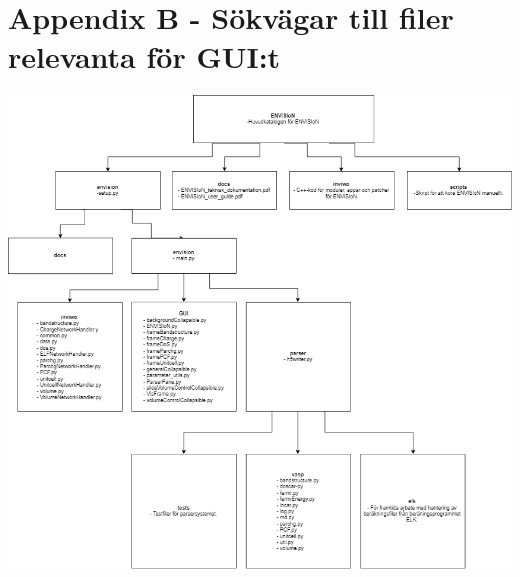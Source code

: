 \newpage
\section{Appendix B - Sökvägar till filer relevanta för GUI:t} \label{sec:GUIAppendix}
 \includegraphics[angle=270,scale=0.6]{images/DirTree.png}
